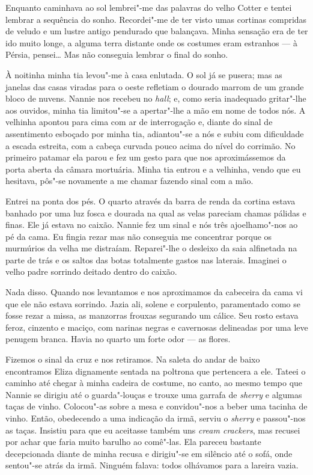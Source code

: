 Enquanto caminhava ao sol lembrei"-me das palavras do velho Cotter e tentei
lembrar a sequência do sonho.  Recordei"-me de ter visto umas cortinas compridas
de veludo e um lustre antigo pendurado que balançava.  Minha sensação era de
ter ido muito longe, a alguma terra distante onde os costumes eram estranhos
--- à Pérsia, pensei\ldots{}  Mas não conseguia lembrar o final do sonho.

À noitinha minha tia levou"-me à casa enlutada.  O sol já se pusera; mas as
janelas das casas viradas para o oeste refletiam o dourado marrom de um grande
bloco de nuvens.  Nannie nos recebeu no \textit{hall}; e, como seria inadequado
gritar"-lhe aos ouvidos, minha tia limitou"-se a apertar"-lhe a mão em nome de
todos nós.  A velhinha apontou para cima com ar de interrogação e, diante do
sinal de assentimento esboçado por minha tia, adiantou"-se a nós e subiu com
dificuldade a escada estreita, com a cabeça curvada pouco acima do nível do
corrimão.  No primeiro patamar ela parou e fez um gesto para que nos
aproximássemos da porta aberta da câmara mortuária.  Minha tia entrou e a
velhinha, vendo que eu hesitava, pôs"-se novamente a me chamar fazendo sinal com
a mão.

Entrei na ponta dos pés.  O quarto através da barra de renda da cortina estava
banhado por uma luz fosca e dourada na qual as velas pareciam chamas pálidas e
finas.  Ele já estava no caixão.  Nannie fez um sinal e nós três ajoelhamo"-nos
ao pé da cama.  Eu fingia rezar mas não conseguia me concentrar porque os
murmúrios da velha me distraíam.  Reparei"-lhe o desleixo da saia alfinetada na
parte de trás e os saltos das botas totalmente gastos nas laterais.  Imaginei o
velho padre sorrindo deitado dentro do caixão.

Nada disso.  Quando nos levantamos e nos aproximamos da cabeceira da cama vi
que ele não estava sorrindo.  Jazia ali, solene e corpulento, paramentado como
se fosse rezar a missa, as manzorras frouxas segurando um cálice.  Seu rosto
estava feroz, cinzento e maciço, com narinas negras e cavernosas delineadas por
uma leve penugem branca.  Havia no quarto um forte odor --- as flores.

Fizemos o sinal da cruz e nos retiramos.  Na saleta do andar de baixo
encontramos Eliza dignamente sentada na poltrona que pertencera a ele.  Tateei
o caminho até chegar à minha cadeira de costume, no canto, ao mesmo tempo que
Nannie se dirigiu até o guarda"-louças e trouxe uma garrafa de \textit{sherry} e
algumas taças de vinho.  Colocou"-as sobre a mesa e convidou"-nos a beber uma
tacinha de vinho.  Então, obedecendo a uma indicação da irmã, serviu o
\textit{sherry} e passou"-nos as taças.  Insistiu para que eu aceitasse também
uns \textit{cream crackers}, mas recusei por achar que faria muito barulho ao
comê"-las.  Ela pareceu bastante decepcionada diante de minha recusa e
dirigiu"-se em silêncio até o sofá, onde sentou"-se atrás da irmã.  Ninguém
falava: todos olhávamos para a lareira vazia.


